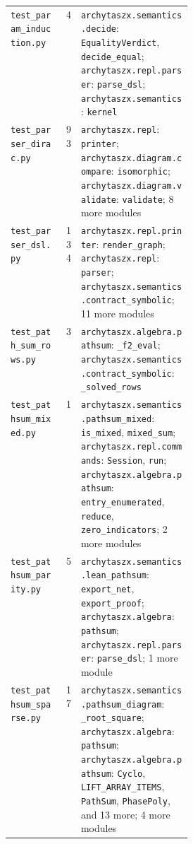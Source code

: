 \begin{xltabular}{\linewidth}{@{}>{\raggedright\arraybackslash}p{0.3\linewidth}r>{\raggedright\arraybackslash}X@{}}
\texttt{test\_\allowbreak{}param\_\allowbreak{}induction.py} & 4 & \texttt{archytaszx.\allowbreak{}semantics.\allowbreak{}decide}: \texttt{EqualityVerdict}, \texttt{decide\_\allowbreak{}equal}; \texttt{archytaszx.\allowbreak{}repl.\allowbreak{}parser}: \texttt{parse\_\allowbreak{}dsl}; \texttt{archytaszx.\allowbreak{}semantics}: \texttt{kernel} \\
\texttt{test\_\allowbreak{}parser\_\allowbreak{}dirac.py} & 93 & \texttt{archytaszx.\allowbreak{}repl}: \texttt{printer}; \texttt{archytaszx.\allowbreak{}diagram.\allowbreak{}compare}: \texttt{isomorphic}; \texttt{archytaszx.\allowbreak{}diagram.\allowbreak{}validate}: \texttt{validate}; 8 more modules \\
\texttt{test\_\allowbreak{}parser\_\allowbreak{}dsl.py} & 134 & \texttt{archytaszx.\allowbreak{}repl.\allowbreak{}printer}: \texttt{render\_\allowbreak{}graph}; \texttt{archytaszx.\allowbreak{}repl}: \texttt{parser}; \texttt{archytaszx.\allowbreak{}semantics.\allowbreak{}contract\_\allowbreak{}symbolic}; 11 more modules \\
\texttt{test\_\allowbreak{}path\_\allowbreak{}sum\_\allowbreak{}rows.py} & 3 & \texttt{archytaszx.\allowbreak{}algebra.\allowbreak{}pathsum}: \texttt{\_\allowbreak{}f2\_\allowbreak{}eval}; \texttt{archytaszx.\allowbreak{}semantics.\allowbreak{}contract\_\allowbreak{}symbolic}: \texttt{\_\allowbreak{}solved\_\allowbreak{}rows} \\
\texttt{test\_\allowbreak{}pathsum\_\allowbreak{}mixed.py} & 1 & \texttt{archytaszx.\allowbreak{}semantics.\allowbreak{}pathsum\_\allowbreak{}mixed}: \texttt{is\_\allowbreak{}mixed}, \texttt{mixed\_\allowbreak{}sum}; \texttt{archytaszx.\allowbreak{}repl.\allowbreak{}commands}: \texttt{Session}, \texttt{run}; \texttt{archytaszx.\allowbreak{}algebra.\allowbreak{}pathsum}: \texttt{entry\_\allowbreak{}enumerated}, \texttt{reduce}, \texttt{zero\_\allowbreak{}indicators}; 2 more modules \\
\texttt{test\_\allowbreak{}pathsum\_\allowbreak{}parity.py} & 5 & \texttt{archytaszx.\allowbreak{}semantics.\allowbreak{}lean\_\allowbreak{}pathsum}: \texttt{export\_\allowbreak{}net}, \texttt{export\_\allowbreak{}proof}; \texttt{archytaszx.\allowbreak{}algebra}: \texttt{pathsum}; \texttt{archytaszx.\allowbreak{}repl.\allowbreak{}parser}: \texttt{parse\_\allowbreak{}dsl}; 1 more module \\
\texttt{test\_\allowbreak{}pathsum\_\allowbreak{}sparse.py} & 17 & \texttt{archytaszx.\allowbreak{}semantics.\allowbreak{}pathsum\_\allowbreak{}diagram}: \texttt{\_\allowbreak{}root\_\allowbreak{}square}; \texttt{archytaszx.\allowbreak{}algebra}: \texttt{pathsum}; \texttt{archytaszx.\allowbreak{}algebra.\allowbreak{}pathsum}: \texttt{Cyclo}, \texttt{LIFT\_\allowbreak{}ARRAY\_\allowbreak{}ITEMS}, \texttt{PathSum}, \texttt{PhasePoly}, and 13 more; 4 more modules \\

\end{xltabular}
